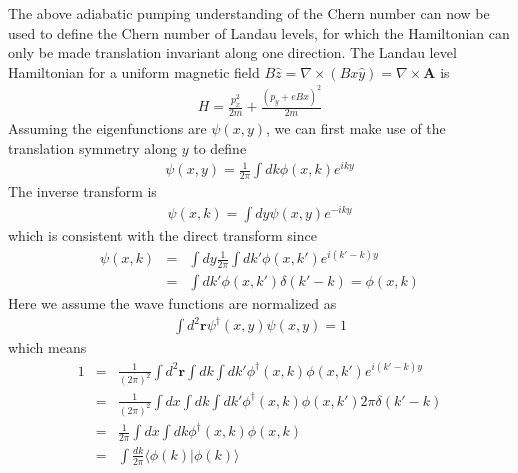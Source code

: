 The above adiabatic pumping understanding of the Chern number can now be used to define the Chern number of Landau levels, for which the Hamiltonian can only be made translation invariant along one direction. The Landau level Hamiltonian for a uniform magnetic field $B\hat{z} = \nabla \times (Bx\hat{y}) = \nabla \times \mathbf A$ is
\begin{eqnarray}
	H = \frac{p_x^2}{2 m } + \frac{(p_y + eBx)^2}{2m}
\end{eqnarray}
Assuming the eigenfunctions are $\psi(x,y)$, we can first make use of the translation symmetry along $y$ to define
\begin{eqnarray}
	\psi(x,y) = \frac{1}{2\pi}\int dk \phi(x,k) e^{iky}
\end{eqnarray}
The inverse transform is
\begin{eqnarray}
\psi(x,k) = \int dy \psi(x,y) e^{-iky}
\end{eqnarray}
which is consistent with the direct transform since
\begin{eqnarray}
\psi(x,k) &=& \int dy \frac{1}{2\pi}\int dk' \phi(x,k') e^{i(k'-k)y} \\\nonumber
&=& \int dk' \phi(x,k')\delta(k'-k) = \phi(x,k)
\end{eqnarray}
Here we assume the wave functions are normalized as
\begin{eqnarray}
	\int d^2\mathbf r \psi^\dag(x,y)\psi(x,y) = 1
\end{eqnarray}
which means
\begin{eqnarray}\label{eq:phinorm}
	1 &=& \frac{1}{(2\pi)^2}\int d^2{\mathbf r} \int dk \int dk' \phi^\dag(x,k)\phi(x,k')e^{i(k'-k)y}\\\nonumber
	&=&\frac{1}{(2\pi)^2} \int dx \int dk\int dk' \phi^\dag(x,k)\phi(x,k') 2\pi\delta(k'-k) \\\nonumber
	&=& \frac{1}{2\pi}\int dx \int dk \phi^\dag(x,k)\phi(x,k) \\\nonumber
	&=& \int\frac{dk}{2\pi} \langle \phi(k) | \phi(k)\rangle
\end{eqnarray}

